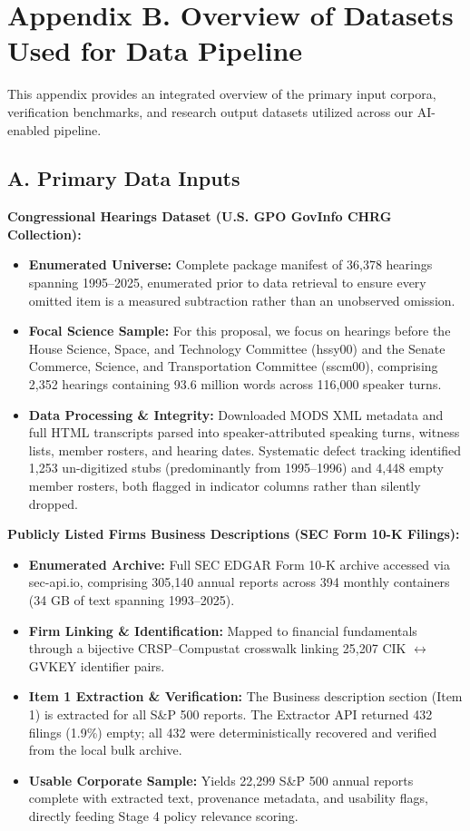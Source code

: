 \documentclass[11pt]{article}
\begin{document}
\clearpage
\section*{Appendix B. Overview of Datasets Used for Data Pipeline}

This appendix provides an integrated overview of the primary input corpora, verification benchmarks, and research output datasets utilized across our AI-enabled pipeline.

\subsection*{A. Primary Data Inputs}

\textbf{Congressional Hearings Dataset (U.S. GPO GovInfo CHRG Collection):}
\begin{itemize}
    \item \textbf{Enumerated Universe:} Complete package manifest of 36,378 hearings spanning 1995--2025, enumerated prior to data retrieval to ensure every omitted item is a measured subtraction rather than an unobserved omission.
    \item \textbf{Focal Science Sample:} For this proposal, we focus on hearings before the House Science, Space, and Technology Committee (hssy00) and the Senate Commerce, Science, and Transportation Committee (sscm00), comprising 2,352 hearings containing 93.6 million words across 116,000 speaker turns.
    \item \textbf{Data Processing \& Integrity:} Downloaded MODS XML metadata and full HTML transcripts parsed into speaker-attributed speaking turns, witness lists, member rosters, and hearing dates. Systematic defect tracking identified 1,253 un-digitized stubs (predominantly from 1995--1996) and 4,448 empty member rosters, both flagged in indicator columns rather than silently dropped.
\end{itemize}

\textbf{Publicly Listed Firms Business Descriptions (SEC Form 10-K Filings):}
\begin{itemize}
    \item \textbf{Enumerated Archive:} Full SEC EDGAR Form 10-K archive accessed via sec-api.io, comprising 305,140 annual reports across 394 monthly containers (34 GB of text spanning 1993--2025).
    \item \textbf{Firm Linking \& Identification:} Mapped to financial fundamentals through a bijective CRSP--Compustat crosswalk linking 25,207 CIK $\leftrightarrow$ GVKEY identifier pairs.
    \item \textbf{Item 1 Extraction \& Verification:} The Business description section (Item 1) is extracted for all S\&P 500 reports. The Extractor API returned 432 filings (1.9\%) empty; all 432 were deterministically recovered and verified from the local bulk archive.
    \item \textbf{Usable Corporate Sample:} Yields 22,299 S\&P 500 annual reports complete with extracted text, provenance metadata, and usability flags, directly feeding Stage 4 policy relevance scoring.
\end{itemize}
\end{document}
